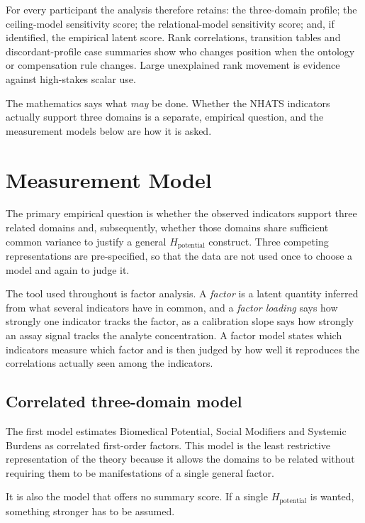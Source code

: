 For every participant the analysis therefore retains: the three-domain profile;
the ceiling-model sensitivity score; the relational-model sensitivity score;
and, if identified, the empirical latent score. Rank correlations, transition
tables and discordant-profile case summaries show who changes position when the
ontology or compensation rule changes. Large unexplained rank movement is
evidence against high-stakes scalar use.

The mathematics says what \emph{may} be done. Whether the NHATS indicators
actually support three domains is a separate, empirical question, and the
measurement models below are how it is asked.

\section{Measurement Model}
\label{sec:sem}

The primary empirical question is whether the observed indicators support three related domains and, subsequently, whether those domains share sufficient common variance to justify a general $H_{\text{potential}}$ construct. Three competing representations are pre-specified, so that the data are not used once to choose a model and again to judge it.

The tool used throughout is factor analysis. A \emph{factor} is a latent quantity inferred from what several indicators have in common, and a \emph{factor loading} says how strongly one indicator tracks the factor, as a calibration slope says how strongly an assay signal tracks the analyte concentration. A factor model states which indicators measure which factor and is then judged by how well it reproduces the correlations actually seen among the indicators.

\subsection{Correlated three-domain model}

The first model estimates Biomedical Potential, Social Modifiers and Systemic Burdens as correlated first-order factors. This model is the least restrictive representation of the theory because it allows the domains to be related without requiring them to be manifestations of a single general factor.

It is also the model that offers no summary score. If a single $H_{\text{potential}}$ is wanted, something stronger has to be assumed.

